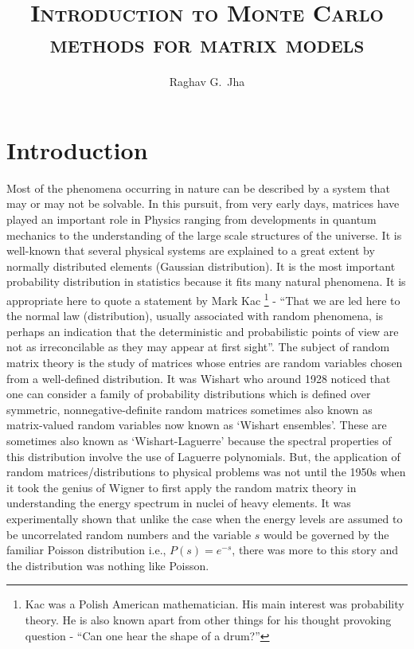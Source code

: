 \documentclass[11pt]{article}
\title{\textsc{Introduction to Monte Carlo methods for matrix models}}
\author[a]{Raghav G.~Jha}
\affiliation{Perimeter Institute for Theoretical Physics, Waterloo, Ontario N2L 2Y5, Canada}
\begin{document}
\date{}
\maketitle

\section{Introduction}

Most of the phenomena occurring in nature can be described by a system that may or may not be solvable. 
In this pursuit, from very early days, matrices have played an important role in Physics ranging from 
developments in quantum mechanics to the understanding of the large scale structures of the universe. 
It is well-known that several physical systems are explained to a great extent 
by normally distributed elements (Gaussian distribution). It is the most important probability 
distribution in statistics because it fits many natural phenomena. It is appropriate here to quote a statement by Mark Kac 
\footnote{Kac was a Polish American mathematician. His main interest was probability theory. 
He is also known apart from other things for his thought provoking question - ``Can one hear 
the shape of a drum?''} - ``That we are led here to the normal law (distribution), usually associated with random phenomena, is perhaps
an indication that the deterministic and probabilistic points of view are not as irreconcilable as they may appear at first sight''.
The subject of random matrix theory is the study of matrices whose entries are random 
variables chosen from a well-defined distribution. It was Wishart who 
around 1928 noticed that one can consider a family of 
probability distributions which is defined over symmetric, nonnegative-definite 
random matrices sometimes also known as matrix-valued random variables 
now known as `Wishart ensembles'. These are sometimes also known 
as `Wishart-Laguerre' because the spectral properties of this distribution 
involve the use of Laguerre polynomials. But, the application of random matrices/distributions
to physical problems was not until the 1950s
when it took the genius of Wigner to first apply the random matrix theory 
in understanding the energy spectrum in nuclei of heavy elements. It was experimentally 
shown that unlike the case when the energy levels are assumed to be uncorrelated
random numbers and the variable $s$ would be governed by the familiar Poisson distribution 
i.e., $P(s) = e^{-s}$, there was more to this story and the distribution was nothing like Poisson. 
\end{document}
